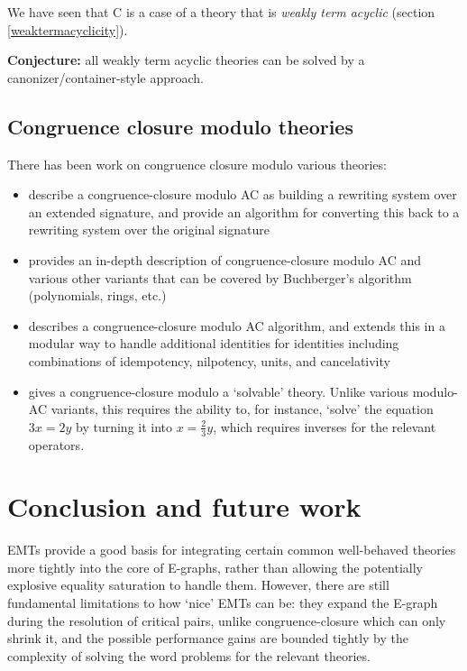 \documentclass[12pt,a4paper,twoside,openright]{report}
\numberwithin{equation}{chapter}		%
\numberwithin{figure}{chapter}			%
\numberwithin{table}{chapter}			%
\theoremstyle{definition}
\theoremstyle{plain}
\begin{document}
We have seen that C is a case of a theory that is \emph{weakly term acyclic} (section \ref{weaktermacyclicity}).

\textbf{Conjecture:} all weakly term acyclic theories can be solved by a canonizer/container-style approach.

\section{Congruence closure modulo theories} \label{ccmodx}
There has been work on congruence closure modulo various theories:
\begin{itemize}
	\item \cite{goos_congruence_2000} describe a congruence-closure modulo AC as building a rewriting system over an extended signature, and provide an algorithm for converting this back to a rewriting system over the original signature
	\item \cite{tiwari_decision_2000} provides an in-depth description of congruence-closure modulo AC and various other variants that can be covered by Buchberger's algorithm (polynomials, rings, etc.)
	\item \cite{kapur_modular_2021} describes a congruence-closure modulo AC algorithm, and \cite{kapur_modularity_2023} extends this in a modular way to handle additional identities for identities including combinations of idempotency, nilpotency, units, and cancelativity
	\item \cite{conchon_ccx_2008} gives a congruence-closure modulo a `solvable' theory. Unlike various modulo-AC variants, this requires the ability to, for instance, `solve' the equation $3x = 2y$ by turning it into $x = \frac{2}{3} y$, which requires inverses for the relevant operators.
\end{itemize}

\chapter{Conclusion and future work} \label{conclu}
EMTs provide a good basis for integrating certain common well-behaved theories more tightly into the core of E-graphs, rather than allowing the potentially explosive equality saturation to handle them. However, there are still fundamental limitations to how `nice' EMTs can be: they expand the E-graph during the resolution of critical pairs, unlike congruence-closure which can only shrink it, and the possible performance gains are bounded tightly by the complexity of solving the word problems for the relevant theories.
\end{document}
